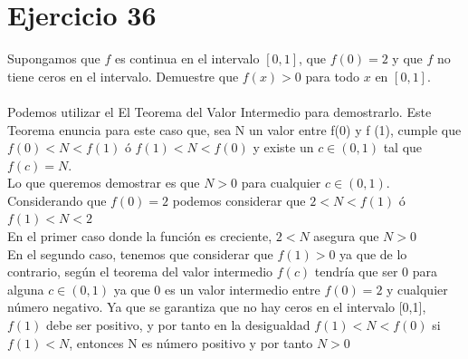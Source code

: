 \documentclass[12pt]{article}
\begin{document}
\section{Ejercicio 36}
Supongamos que $f$ es continua en el intervalo $[0, 1]$, que $f(0) = 2$ y que $f$ no tiene ceros en el intervalo. Demuestre que $f(x) > 0$ para todo $x$ en $[0, 1]$.\\ \\

Podemos utilizar el El Teorema del Valor Intermedio para demostrarlo. Este Teorema enuncia para este caso que, sea N un valor entre f(0) y f (1), cumple que $f(0)<N<f(1)$ ó $f(1)<N<f(0)$ y existe un $c \in (0, 1)$ tal que $f(c) = N$.\\
Lo que queremos demostrar es que $N>0$ para cualquier $c \in (0, 1)$. \\
Considerando que $f(0) = 2 $ podemos considerar que $2<N<f(1)$ ó $f(1)<N<2$  \\
En el primer caso donde la función es creciente, $2<N$ asegura que $N>0$ \\
En el segundo caso, tenemos que considerar que $f(1)>0$ ya que de lo contrario, según el teorema del valor intermedio $f(c)$ tendría que ser $0$ para alguna $c \in (0, 1)$ ya que 0 es un valor intermedio entre $f(0) = 2$ y cualquier número negativo. Ya que se garantiza que no hay ceros en el intervalo [0,1], $f(1)$ debe ser positivo, y por tanto en la desigualdad  $f(1)<N<f(0)$ si $f(1)<N$, entonces N es número positivo y por tanto $N>0$
\end{document}
